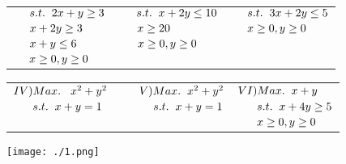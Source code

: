 \documentclass{report}
\begin{document}
\begin{enumerate}
\begin{tabular}{|ll|l|}
\multicolumn{2}{|l|}{$ \hspace{0.5cm}s.t. \hspace{0.2cm} 2x+y \geq 3 \hspace{1cm} s.t. \hspace{0.2cm} x+2y \leq 10$} & $\hspace{0.5cm}s.t. \hspace{0.2cm} 3x+2y \leq 5$ \\[0.2cm]

\multicolumn{2}{|l|}{$ \hspace{0.5cm} x + 2y\geq 3 \hspace{1.7cm} x \geq 20$} & $\hspace{0.5cm}x \geq 0, y \geq 0$ \\[0.2cm]

\multicolumn{2}{|l|}{$ \hspace{0.5cm} x + y\leq 6 \hspace{1.9cm} x \geq 0, y \geq 0$} & \\[0.2cm]

\multicolumn{2}{|l|}{$ \hspace{0.5cm} x \geq 0, y \geq 0 $} & \\ \hline
\end{tabular}

\begin{tabular}{|ll|l|}
\hline
\multicolumn{2}{|l|}{$ IV)Max. \hspace{0.3cm}x^2+y^2 \hspace{1cm} V)Max.\hspace{0.2cm} x^2 + y^2$} & $VI)Max. \hspace{0.2cm} x+y$  \\[0.2cm]

\multicolumn{2}{|l|}{$ \hspace{0.6cm}s.t. \hspace{0.2cm} x+y =1 \hspace{1.6cm} s.t. \hspace{0.2cm} x+y = 1$} & $\hspace{0.6cm}s.t. \hspace{0.2cm} x+4y \geq 5$ \\[0.2cm]

\multicolumn{2}{|l|}{} & $\hspace{0.6cm}x \geq 0, y \geq 0$ \\ \hline

\end{tabular}
\end{enumerate}

\begin{center}
\texttt{[image: ./1.png]}
\end{center}
\end{document}
